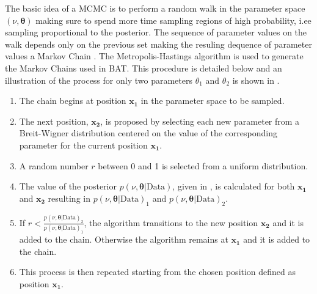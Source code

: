 The basic idea of a MCMC is to perform a random walk in the parameter space
$(\nu,\boldsymbol{\theta})$ making sure to spend more time sampling regions of
high probability, i.ee sampling proportional to the posterior.  The sequence of
parameter values on the walk depends only on the previous set making the
resuling dequence of parameter values a Markov Chain \cite{Markov2006}.  The
Metropolis-Hastings algorithm \cite{10.2307/2334940,Beresford:2642397} is used
to generate the Markov Chains used in BAT.  This procedure is detailed below
and an illustration of the process for only two parameters $\theta_{1}$ and
$\theta_{2}$ is shown in .

\begin{enumerate}
\item The chain begins at position $\boldsymbol{x_{1}}$ in the parameter space to be sampled.
\item The next position, $\boldsymbol{x_{2}}$, is proposed by selecting each new parameter from a Breit-Wigner distribution centered on the value of the corresponding parameter for the current position $\boldsymbol{x_{1}}$.
\item A random number $r$ between 0 and 1 is selected from a uniform distribution.
\item The value of the posterior $p(\nu,\boldsymbol{\theta}|\text{Data})$, given in , is calculated for both  $\boldsymbol{x_{1}}$ and  $\boldsymbol{x_{2}}$ resulting in $p(\nu,\boldsymbol{\theta}|\text{Data})_{1}$ and $p(\nu,\boldsymbol{\theta}|\text{Data})_{2}$.
\item If $r < \frac{p(\nu,\boldsymbol{\theta}|\text{Data})_{2}}{p(\nu,\boldsymbol{\theta}|\text{Data})_{1}}$, the algorithm transitions to the new position $\boldsymbol{x_{2}}$ and it is added to the chain. Otherwise the algorithm remains at $\boldsymbol{x_{1}}$ and it is added to the chain.
\item This process is then repeated starting from the chosen position defined as position $\boldsymbol{x_{1}}$.
\end{enumerate}

